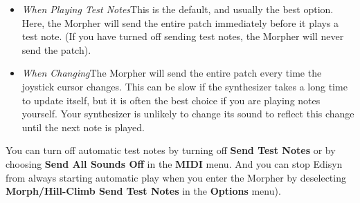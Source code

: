 \documentclass{article}
\begin{document}
\begin{itemize}
\item {\it When Playing Test Notes}\quad This is the default, and usually the best option.  Here, the Morpher will send the entire patch immediately before it plays a test note.  (If you have turned off sending test notes, the Morpher will never send the patch).  
\item {\it When Changing}\quad The Morpher will send the entire patch every time the joystick cursor changes.  This can be slow if the synthesizer takes a long time to update itself, but it is often the best choice if you are playing notes yourself.  Your synthesizer is unlikely to change its sound to reflect this change until the next note is played.
\end{itemize}

You can turn off automatic test notes by turning off {\bf Send Test Notes} or by choosing {\bf Send All Sounds Off} in the {\bf MIDI} menu.  And you can stop Edisyn from always starting automatic play when you enter the Morpher by deselecting {\bf Morph/Hill-Climb Send Test Notes} in the {\bf Options} menu).
\end{document}
